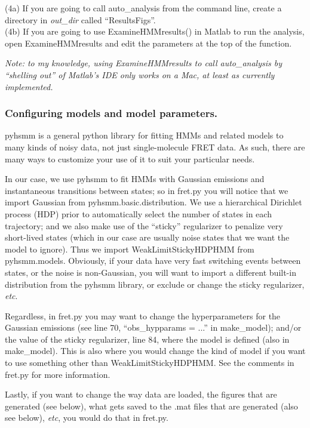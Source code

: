 \documentclass[11pt]{article}
\begin{document}
\noindent (4a) If you are going to call auto\_analysis from the command line, create a directory in {\it out\_dir} called ``ResultsFigs''.\\

\noindent (4b) If you are going to use ExamineHMMresults() in Matlab to run the analysis, open ExamineHMMresults and edit the parameters at the top of the function.

{\it Note: to my knowledge, using ExamineHMMresults to call auto\_analysis by ``shelling out'' of Matlab's IDE only works on a Mac, at least as currently implemented.}

\subsubsection{Configuring models and model parameters.}

pyhsmm is a general python library for fitting HMMs and related models to many kinds of noisy data, not just single-molecule FRET data. As such, there are many ways to customize your use of it to suit your particular needs.

In our case, we use pyhsmm to fit HMMs with Gaussian emissions and instantaneous transitions between states; so in fret.py you will notice that we import Gaussian from pyhsmm.basic.distribution. We use a hierarchical Dirichlet process (HDP) prior to automatically select the number of states in each trajectory; and we also make use of the ``sticky'' regularizer to penalize very short-lived states (which in our case are usually noise states that we want the model to ignore). Thus we import WeakLimitStickyHDPHMM from pyhsmm.models. Obviously, if your data have very fast switching events between states, or the noise is non-Gaussian, you will want to import a different built-in distribution from the pyhsmm library, or exclude or change the sticky regularizer, {\it etc}.

Regardless, in fret.py you may want to change the hyperparameters for the Gaussian emissions (see line 70, ``obs\_hypparams = ...'' in make\_model); and/or the value of the sticky regularizer, line 84, where the model is defined (also in make\_model). This is also where you would change the kind of model if you want to use something other than WeakLimitStickyHDPHMM. See the comments in fret.py for more information.

Lastly, if you want to change the way data are loaded, the figures that are generated (see below), what gets saved to the .mat files that are generated (also see below), {\it etc}, you would do that in fret.py.
\end{document}
